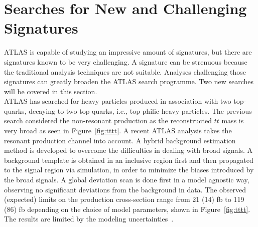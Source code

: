 \documentclass{moriond}
\begin{document}
\section{Searches for New and Challenging Signatures}

ATLAS is capable of studying an impressive amount of signatures, but there are
signatures known to be very challenging. A signature can be strenuous because
the traditional analysis techniques are not suitable. Analyses challenging
those signatures can greatly broaden the ATLAS search programme. Two new
searches will be covered in this section.\\

ATLAS has searched for heavy particles produced in association with two
top-quarks, decaying to two top-quarks, i.e., top-philic heavy particles. The
previous search considered the non-resonant production as the reconstructed
$t\overline{t}$ mass is very broad as seen in
Figure~\ref{fig:tttt}. A recent ATLAS analysis takes the
resonant production channel into account. A hybrid background estimation method
is developed to overcome the difficulties in dealing with broad signals. A
background template is obtained in an inclusive region first and then
propagated to the signal region via simulation, in order to minimize the biases
introduced by the broad signals. A global deviation scan is done first in a
model agnostic way, observing no significant deviations from the background in
data. The observed
(expected) limits on the production cross-section range from 21 (14) fb to 119
(86) fb depending on the choice of model parameters, shown in
Figure~\ref{fig:tttt}. The results are limited by the
modeling uncertainties~\cite{tttt}.\\    
\end{document}

